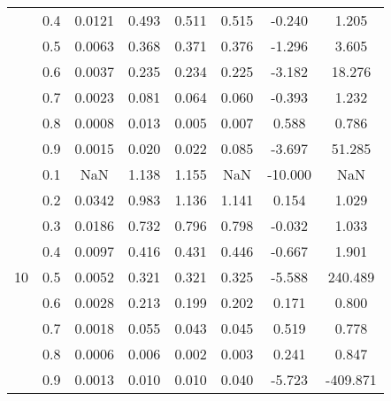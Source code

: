\documentclass[11pt,a4paper]{report}
\begin{document}
\begin{longtable}{ | c | c || c | c | c | c | c | c | }
 & 0.4 & 0.0121 & 0.493 & 0.511 & 0.515 & -0.240 & 1.205 \\
 & 0.5 & 0.0063 & 0.368 & 0.371 & 0.376 & -1.296 & 3.605 \\
 & 0.6 & 0.0037 & 0.235 & 0.234 & 0.225 & -3.182 & 18.276 \\
 & 0.7 & 0.0023 & 0.081 & 0.064 & 0.060 & -0.393 & 1.232 \\
 & 0.8 & 0.0008 & 0.013 & 0.005 & 0.007 & 0.588 & 0.786 \\
 & 0.9 & 0.0015 & 0.020 & 0.022 & 0.085 & -3.697 & 51.285 \\
 \hline
\multirow{9}{*}{10} & 0.1 & NaN & 1.138 & 1.155 & NaN & -10.000 & NaN \\
 & 0.2 & 0.0342 & 0.983 & 1.136 & 1.141 & 0.154 & 1.029 \\
 & 0.3 & 0.0186 & 0.732 & 0.796 & 0.798 & -0.032 & 1.033 \\
 & 0.4 & 0.0097 & 0.416 & 0.431 & 0.446 & -0.667 & 1.901 \\
 & 0.5 & 0.0052 & 0.321 & 0.321 & 0.325 & -5.588 & 240.489 \\
 & 0.6 & 0.0028 & 0.213 & 0.199 & 0.202 & 0.171 & 0.800 \\
 & 0.7 & 0.0018 & 0.055 & 0.043 & 0.045 & 0.519 & 0.778 \\
 & 0.8 & 0.0006 & 0.006 & 0.002 & 0.003 & 0.241 & 0.847 \\
 & 0.9 & 0.0013 & 0.010 & 0.010 & 0.040 & -5.723 & -409.871 \\
 \hline
\hline
\end{longtable}
\end{document}
